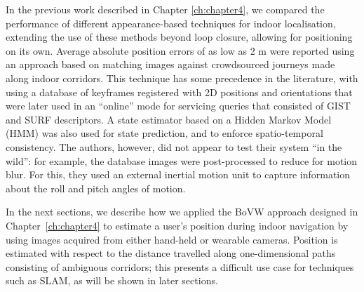 
In the previous work \citep{RiveraWearable} described in Chapter \ref{ch:chapter4}, we compared the performance of different appearance-based techniques for indoor localisation, extending the use of these methods beyond loop closure, allowing for positioning on its own. Average absolute position errors of as low as 2 m were reported using an approach based on matching images against crowdsourced journeys made along indoor corridors. This technique has some precedence in the literature, with \citet{liu2010video} using a database of keyframes registered with 2D positions and orientations that were later used in an ``online'' mode for servicing queries that consisted of GIST and SURF descriptors. A state estimator based on a Hidden Markov Model (HMM) was also used for state prediction, and to enforce spatio-temporal consistency. The authors, however, did not appear to test their system ``in the wild'': for example, the database images were post-processed to reduce for motion blur. For this, they used an external inertial motion unit to capture information about the roll and pitch angles of motion. 

In the next sections, we describe how we applied the BoVW approach designed in Chapter~\ref{ch:chapter4} to estimate a user's position during indoor navigation by using images acquired from either hand-held or wearable cameras.  Position is estimated with respect to the distance travelled along one-dimensional paths consisting of ambiguous corridors; this presents a difficult use case for techniques such as SLAM, as will be shown in later sections.

